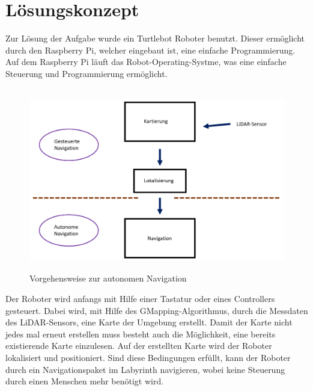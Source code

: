 \section{Lösungskonzept}
{
	Zur Lösung der Aufgabe wurde ein Turtlebot Roboter benutzt. Dieser ermöglicht durch den Raspberry Pi, welcher eingebaut ist, eine einfache Programmierung. Auf dem Raspberry Pi läuft das Robot-Operating-Systme, was eine einfache Steuerung und Programmierung ermöglicht.
	\begin{figure}[H]
		\centering
		\includegraphics[height=8cm]{Bilder/overview_concept.png}
		\caption{Vorgehensweise zur autonomen Navigation} 
		\label{pic:overviewconcept}
	\end{figure}
Der Roboter wird anfangs mit Hilfe einer Tastatur oder eines Controllers gesteuert. Dabei wird, mit Hilfe des GMapping-Algorithmus, durch die Messdaten des LiDAR-Sensors, eine Karte der Umgebung erstellt. Damit der Karte nicht jedes mal erneut erstellen muss besteht auch die Möglichkeit, eine bereits existierende Karte einzulesen. Auf der erstellten Karte wird der Roboter lokalisiert und positioniert. Sind diese Bedingungen erfüllt, kann der Roboter durch ein Navigationspaket im Labyrinth navigieren, wobei keine Steuerung durch einen Menschen mehr benötigt wird.
}